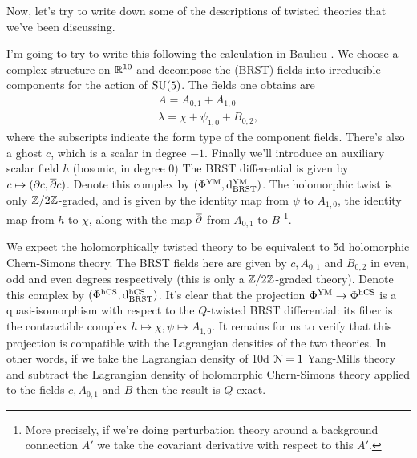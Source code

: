 \documentclass[10pt, oneside]{article}
\newcommand{\dBRST}{\mathrm d_{\mathrm{BRST}}}
\begin{document}
Now, let's try to write down some of the descriptions of twisted theories that we've been discussing.
\begin{example}[10d $\mc N=1$ Super Yang-Mills]
I'm going to try to write this following the calculation in Baulieu \cite{Baulieu}.  We choose a complex structure on $\mathbb{R}^{10}$ and decompose the (BRST) fields into irreducible components for the action of $\mathrm{SU}(5)$.  The fields one obtains are
\begin{align*}
A = A_{0, 1} + A_{1, 0} \\
\lambda = \chi + \psi_{1, 0} + B_{0, 2},
\end{align*}
where the subscripts indicate the form type of the component fields.  There's also a ghost $c$, which is a scalar in degree $-1$.  Finally we'll introduce an auxiliary scalar field $h$ (bosonic, in degree 0)   The BRST differential is given by $c \mapsto (\partial c, \overline{\partial} c)$.  Denote this complex by $(\Phi^{\mr{YM}}, \dBRST^{\mr{YM}})$.  The holomorphic twist is only $\mathbb{Z}/2\mathbb{Z}$-graded, and is given by the identity map from $\psi$ to $A_{1,0}$, the identity map from $h$ to $\chi$, along with the map $\overline{\partial}$ from $A_{0,1}$ to $B$ \footnote{More precisely, if we're doing perturbation theory around a background connection $A'$ we take the covariant derivative with respect to this $A'$.}.  

We expect the holomorphically twisted theory to be equivalent to 5d holomorphic Chern-Simons theory.  The BRST fields here are given by $c, A_{0,1}$ and $B_{0,2}$ in even, odd and even degrees respectively (this is only a $\mathbb{Z}/2\mathbb{Z}$-graded theory).  Denote this complex by $(\Phi^{\mr{hCS}},\dBRST^{\mr{hCS}})$.  It's clear that the projection $\Phi^{\mathrm{YM}} \to \Phi^{\mathrm{hCS}}$ is a quasi-isomorphism with respect to the $Q$-twisted BRST differential: its fiber is the contractible complex $h \mapsto \chi, \psi \mapsto A_{1,0}$.  It remains for us to verify that this projection is compatible with the Lagrangian densities of the two theories.  In other words, if we take the Lagrangian density of 10d $\mc N=1$ Yang-Mills theory and subtract the Lagrangian density of holomorphic Chern-Simons theory applied to the fields $c, A_{0,1}$ and $B$ then the result is $Q$-exact.


\end{example}
\end{document}
